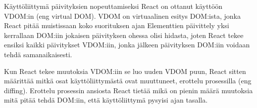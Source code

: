 

Käyttöliittymä päivityksien nopeuttamiseksi React on ottanut käyttöön VDOM:in (eng virtual DOM).
VDOM on virtuaalinen esitys DOM:ista, jonka React pitää muistissaan koko suorituksen ajan
Elementtien päivittely yksi kerrallaan DOM:iin jokaisen päivityksen ohessa olisi hidasta,
joten React tekee ensiksi kaikki päivitykset VDOM:iin, jonka jälkeen päivityksen DOM:iin voidaan tehdä samanaikaisesti.
%
%
\medskip

Kun React tekee muutoksia VDOM:iin se luo uuden VDOM puun,
React sitten määrittää mitkä osat käyttöliittymästä ovat muuttuneet, erottelu prosessilla (eng diffing).
Erottelu prosessin ansiosta React tietää mikä on pienin määrä muutoksia mitä pitää tehdä DOM:iin, 
että käyttöliittymä pysyisi ajan tasalla.
\medskip



